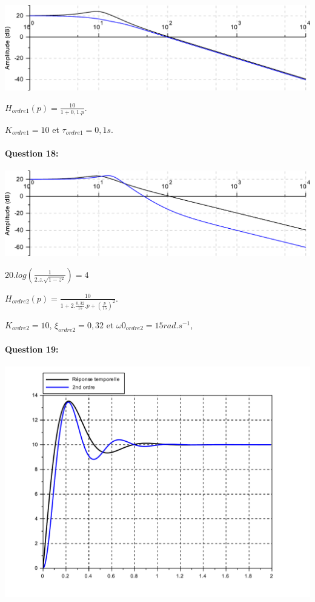 \begin{center}
 \includegraphics[width=\linewidth]{img/q17_cor}
\end{center}

$H_{ordre1}(p)=\frac{10}{1+0,1.p}$.

$K_{ordre1}=10$ et $\tau_{ordre1}=0,1s$.

\newpage

\paragraph{Question 18:}

\begin{center}
 \centering\includegraphics[width=\linewidth]{img/q18_cor}
\end{center}

$20.log\left(\frac{1}{2.z.\sqrt{1-z^2}}\right)=4$

$H_{ordre2}(p)=\frac{10}{1+2.\frac{0,32}{15}.p+(\frac{p}{15})^2}$.

$K_{ordre2}=10$, $\xi_{ordre2}=0,32$ et $\omega0_{ordre2}=15rad.s^{-1}$, 

\paragraph{Question 19:}

\begin{center}
 \includegraphics[width=\linewidth]{img/q19_cor}
\end{center}


